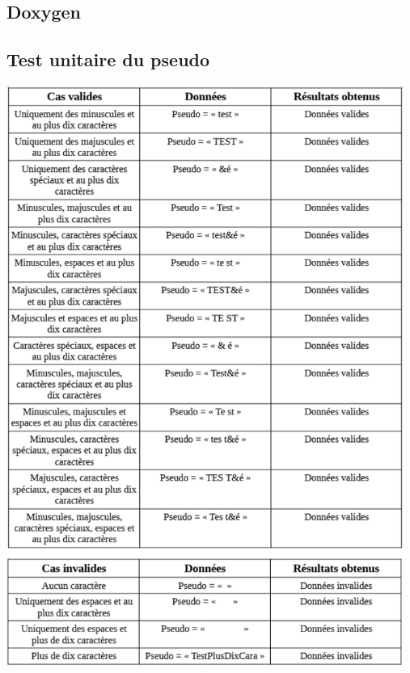 \documentclass[12pt,a4paper]{article}
\begin{document}
        \subsection{Doxygen}
        \label{subsec:doxygen}

        \newpage
            
        \subsection{Test unitaire du pseudo}
        \label{subsec:test_unitaire_pseudo}
        \includegraphics[width=13cm]{images/test_unitaire_pseudo.png}
\end{document}
